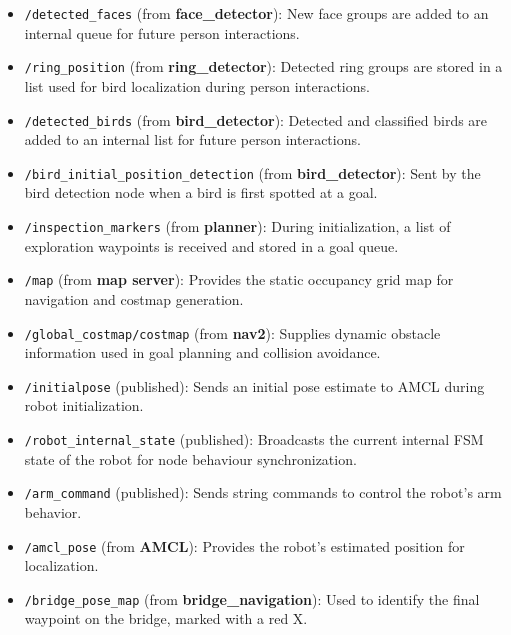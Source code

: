 \documentclass[a4paper]{article}
\begin{document}
\begin{itemize}
    \item \texttt{/detected\_faces} (from \textbf{face\_detector}): 
    New face groups are added to an internal queue for future person interactions.
    
    \item \texttt{/ring\_position} (from \textbf{ring\_detector}): 
    Detected ring groups are stored in a list used for bird localization during person interactions.

    \item \texttt{/detected\_birds} (from \textbf{bird\_detector}): 
    Detected and classified birds are added to an internal list for future person interactions.

    \item \texttt{/bird\_initial\_position\_detection} (from \textbf{bird\_detector}): 
    Sent by the bird detection node when a bird is first spotted at a goal.

    \item \texttt{/inspection\_markers} (from \textbf{planner}): 
    During initialization, a list of exploration waypoints is received and stored in a goal queue.

    \item \texttt{/map} (from \textbf{map server}): 
    Provides the static occupancy grid map for navigation and costmap generation.

    \item \texttt{/global\_costmap/costmap} (from \textbf{nav2}): 
    Supplies dynamic obstacle information used in goal planning and collision avoidance.

    \item \texttt{/initialpose} (published): 
    Sends an initial pose estimate to AMCL during robot initialization.

    \item \texttt{/robot\_internal\_state} (published): 
    Broadcasts the current internal FSM state of the robot for node behaviour synchronization.

    \item \texttt{/arm\_command} (published): 
    Sends string commands to control the robot's arm behavior.

    \item \texttt{/amcl\_pose} (from \textbf{AMCL}): 
    Provides the robot’s estimated position for localization.

    \item \texttt{/bridge\_pose\_map} (from \textbf{bridge\_navigation}): 
    Used to identify the final waypoint on the bridge, marked with a red X.

\end{itemize}
\end{document}
